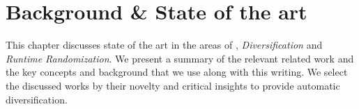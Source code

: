 \chapter{Background \& State of the art}

This chapter discusses state of the art in the areas of \emph{\wasm}, \emph{Diversification} and \emph{Runtime Randomization}. We present a summary of the relevant related work and the key concepts and background that we use along with this writing. 
We select the discussed works by their novelty and critical insights to provide automatic diversification. 




\begin{comment}

\todo{Motivate Wasm here}

\todo{Our area is on wasm, compilers, etc}

\todo{The key related work are in the area of X and Y}

\todo{Wasm is not the context ! Define what the context is : compilers, machine code, portable code, Wasm, interpreters, backend, etc. Use background instead of context. Put everythin that is related to the thesis, concepts. }

\todo{Portable code to be distributed}

\end{comment}






